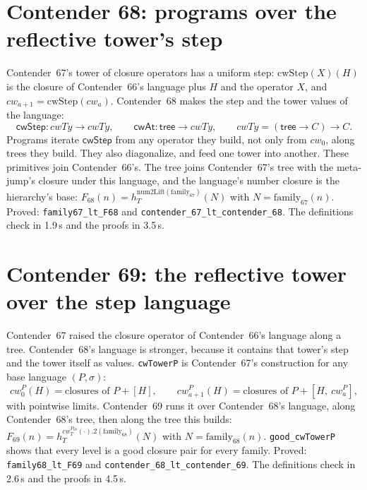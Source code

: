 \documentclass[11pt]{article}
\theoremstyle{definition}
\theoremstyle{remark}
\newcommand{\lean}[1]{\texttt{#1}}
\begin{document}
\section{Contender 68: programs over the reflective tower's step}

Contender~67's tower of closure operators has a uniform step:
$\mathrm{cwStep}(X)(H)$ is the closure of Contender~66's language plus $H$ and the
operator $X$, and $cw_{a+1}=\mathrm{cwStep}(cw_a)$. Contender~68 makes the step
and the tower values of the language:
\[
\mathsf{cwStep}:cwTy\to cwTy,\qquad \mathsf{cwAt}:\mathsf{tree}\to cwTy,\qquad
cwTy=(\mathsf{tree}\to C)\to C .
\]
Programs iterate $\mathsf{cwStep}$ from any operator they build, not only from
$cw_0$, along trees they build. They also diagonalize, and feed one tower into
another. These primitives join Contender~66's. The tree joins Contender~67's tree
with the meta-jump's closure under this language, and the language's number
closure is the hierarchy's base:
$F_{68}(n)=h^{\mathrm{num2Lift}(\mathrm{family}_{67})}_T(N)$ with
$N=\mathrm{family}_{67}(n)$. Proved: \lean{family67\_lt\_F68} and
\lean{contender\_67\_lt\_\allowbreak contender\_68}. The definitions check in
1.9\,s and the proofs in 3.5\,s.

\section{Contender 69: the reflective tower over the step language}

Contender~67 raised the closure operator of Contender~66's language along a
tree. Contender~68's language is stronger, because it contains that tower's step
and the tower itself as values. \lean{cwTowerP} is Contender~67's construction
for any base language $(P,\sigma)$:
\[
cw^P_0(H)=\text{closures of }P+[H],\qquad
cw^P_{a+1}(H)=\text{closures of }P+[H,\ cw^P_a],
\]
with pointwise limits. Contender~69 runs it over Contender~68's language, along
Contender~68's tree, then along the tree this builds:
$F_{69}(n)=h^{cw^{P_{68}}_T(\cdot).2(\mathrm{family}_{68})}_T(N)$ with
$N=\mathrm{family}_{68}(n)$. \lean{good\_cwTowerP} shows that every level is a
good closure pair for every family. Proved: \lean{family68\_lt\_F69} and
\lean{contender\_68\_lt\_\allowbreak contender\_69}. The definitions check in
2.6\,s and the proofs in 4.5\,s.

\end{document}
